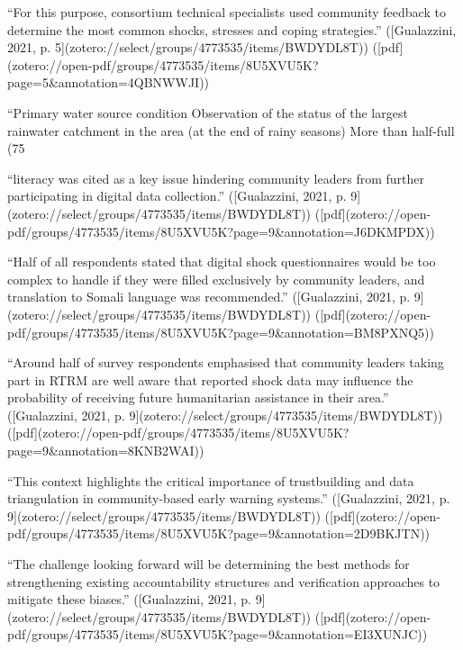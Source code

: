 {{“For this purpose, consortium technical specialists used community feedback to determine the most common shocks, stresses and coping strategies.” ([Gualazzini, 2021, p. 5](zotero://select/groups/4773535/items/BWDYDL8T)) ([pdf](zotero://open-pdf/groups/4773535/items/8U5XVU5K?page=5&annotation=4QBNWWJI))

“Primary water source condition Observation of the status of the largest rainwater catchment in the area (at the end of rainy seasons) More than half-full (75%

“literacy was cited as a key issue hindering community leaders from further participating in digital data collection.” ([Gualazzini, 2021, p. 9](zotero://select/groups/4773535/items/BWDYDL8T)) ([pdf](zotero://open-pdf/groups/4773535/items/8U5XVU5K?page=9&annotation=J6DKMPDX))

“Half of all respondents stated that digital shock questionnaires would be too complex to handle if they were filled exclusively by community leaders, and translation to Somali language was recommended.” ([Gualazzini, 2021, p. 9](zotero://select/groups/4773535/items/BWDYDL8T)) ([pdf](zotero://open-pdf/groups/4773535/items/8U5XVU5K?page=9&annotation=BM8PXNQ5))

“Around half of survey respondents emphasised that community leaders taking part in RTRM are well aware that reported shock data may influence the probability of receiving future humanitarian assistance in their area.” ([Gualazzini, 2021, p. 9](zotero://select/groups/4773535/items/BWDYDL8T)) ([pdf](zotero://open-pdf/groups/4773535/items/8U5XVU5K?page=9&annotation=8KNB2WAI))

“This context highlights the critical importance of trustbuilding and data triangulation in community-based early warning systems.” ([Gualazzini, 2021, p. 9](zotero://select/groups/4773535/items/BWDYDL8T)) ([pdf](zotero://open-pdf/groups/4773535/items/8U5XVU5K?page=9&annotation=2D9BKJTN))

“The challenge looking forward will be determining the best methods for strengthening existing accountability structures and verification approaches to mitigate these biases.” ([Gualazzini, 2021, p. 9](zotero://select/groups/4773535/items/BWDYDL8T)) ([pdf](zotero://open-pdf/groups/4773535/items/8U5XVU5K?page=9&annotation=EI3XUNJC))

}}
